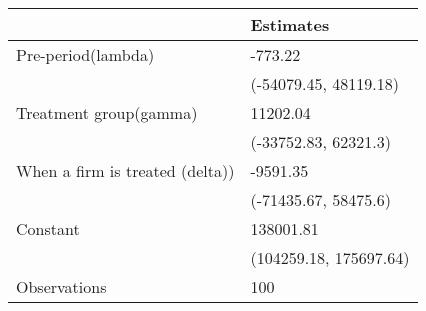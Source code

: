 \begin{tabular}{ll}
\toprule
{} &               Estimates \\
\midrule
Pre-period(lambda)              &                 -773.22 \\
                                &   (-54079.45, 48119.18) \\
Treatment group(gamma)          &                11202.04 \\
                                &    (-33752.83, 62321.3) \\
When a firm is treated (delta)) &                -9591.35 \\
                                &    (-71435.67, 58475.6) \\
Constant                        &               138001.81 \\
                                &  (104259.18, 175697.64) \\
Observations                    &                     100 \\
\bottomrule
\end{tabular}
